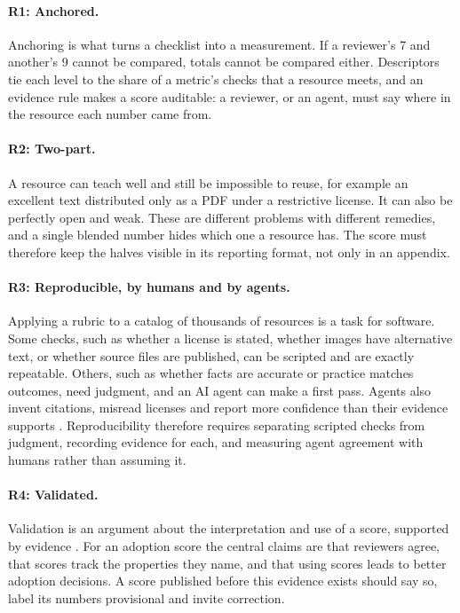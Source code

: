 \paragraph{R1: Anchored.}
Anchoring is what turns a checklist into a measurement. If a reviewer's 7 and another's 9 cannot be compared, totals cannot be compared either. Descriptors tie each level to the share of a metric's checks that a resource meets, and an evidence rule makes a score auditable: a reviewer, or an agent, must say where in the resource each number came from.

\paragraph{R2: Two-part.}
A resource can teach well and still be impossible to reuse, for example an excellent text distributed only as a PDF under a restrictive license. It can also be perfectly open and weak. These are different problems with different remedies, and a single blended number hides which one a resource has. The score must therefore keep the halves visible in its reporting format, not only in an appendix.

\paragraph{R3: Reproducible, by humans and by agents.}
Applying a rubric to a catalog of thousands of resources is a task for software. Some checks, such as whether a license is stated, whether images have alternative text, or whether source files are published, can be scripted and are exactly repeatable. Others, such as whether facts are accurate or practice matches outcomes, need judgment, and an AI agent can make a first pass. Agents also invent citations, misread licenses and report more confidence than their evidence supports \cite{ji2023,zheng2023,wang2024}. Reproducibility therefore requires separating scripted checks from judgment, recording evidence for each, and measuring agent agreement with humans rather than assuming it.

\paragraph{R4: Validated.}
Validation is an argument about the interpretation and use of a score, supported by evidence \cite{messick1995,kane2013}. For an adoption score the central claims are that reviewers agree, that scores track the properties they name, and that using scores leads to better adoption decisions. A score published before this evidence exists should say so, label its numbers provisional and invite correction.

